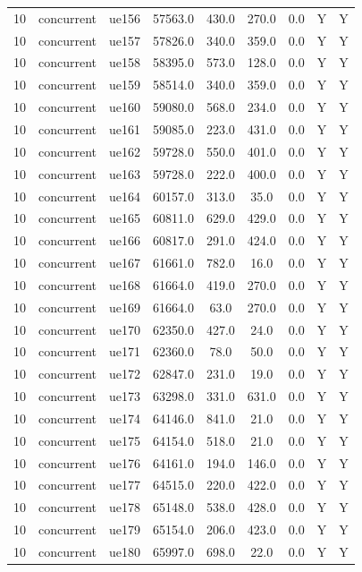 \begin{table}[ht]
\begin{tabular}{|c|c|c|c|c|c|c|c|c|}
10 & concurrent & ue156 & 57563.0 & 430.0 & 270.0 & 0.0 & Y & Y \\
10 & concurrent & ue157 & 57826.0 & 340.0 & 359.0 & 0.0 & Y & Y \\
10 & concurrent & ue158 & 58395.0 & 573.0 & 128.0 & 0.0 & Y & Y \\
10 & concurrent & ue159 & 58514.0 & 340.0 & 359.0 & 0.0 & Y & Y \\
10 & concurrent & ue160 & 59080.0 & 568.0 & 234.0 & 0.0 & Y & Y \\
10 & concurrent & ue161 & 59085.0 & 223.0 & 431.0 & 0.0 & Y & Y \\
10 & concurrent & ue162 & 59728.0 & 550.0 & 401.0 & 0.0 & Y & Y \\
10 & concurrent & ue163 & 59728.0 & 222.0 & 400.0 & 0.0 & Y & Y \\
10 & concurrent & ue164 & 60157.0 & 313.0 & 35.0 & 0.0 & Y & Y \\
10 & concurrent & ue165 & 60811.0 & 629.0 & 429.0 & 0.0 & Y & Y \\
10 & concurrent & ue166 & 60817.0 & 291.0 & 424.0 & 0.0 & Y & Y \\
10 & concurrent & ue167 & 61661.0 & 782.0 & 16.0 & 0.0 & Y & Y \\
10 & concurrent & ue168 & 61664.0 & 419.0 & 270.0 & 0.0 & Y & Y \\
10 & concurrent & ue169 & 61664.0 & 63.0 & 270.0 & 0.0 & Y & Y \\
10 & concurrent & ue170 & 62350.0 & 427.0 & 24.0 & 0.0 & Y & Y \\
10 & concurrent & ue171 & 62360.0 & 78.0 & 50.0 & 0.0 & Y & Y \\
10 & concurrent & ue172 & 62847.0 & 231.0 & 19.0 & 0.0 & Y & Y \\
10 & concurrent & ue173 & 63298.0 & 331.0 & 631.0 & 0.0 & Y & Y \\
10 & concurrent & ue174 & 64146.0 & 841.0 & 21.0 & 0.0 & Y & Y \\
10 & concurrent & ue175 & 64154.0 & 518.0 & 21.0 & 0.0 & Y & Y \\
10 & concurrent & ue176 & 64161.0 & 194.0 & 146.0 & 0.0 & Y & Y \\
10 & concurrent & ue177 & 64515.0 & 220.0 & 422.0 & 0.0 & Y & Y \\
10 & concurrent & ue178 & 65148.0 & 538.0 & 428.0 & 0.0 & Y & Y \\
10 & concurrent & ue179 & 65154.0 & 206.0 & 423.0 & 0.0 & Y & Y \\
10 & concurrent & ue180 & 65997.0 & 698.0 & 22.0 & 0.0 & Y & Y \\

\end{tabular}
\end{table}
